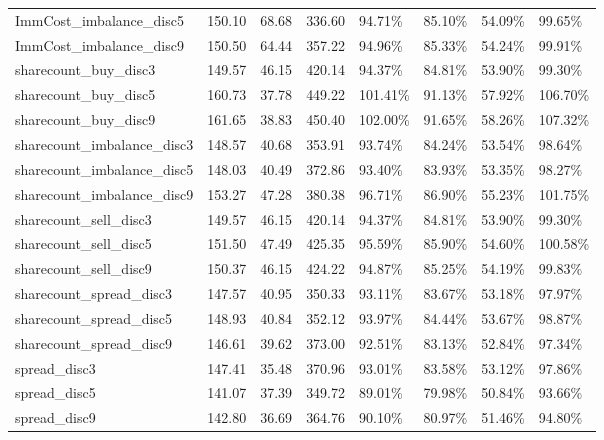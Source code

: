 \begin{table}[ht]
{\begin{tabular}{lrrrllll}
ImmCost\_imbalance\_disc5      &    150.10 &   68.68 &  336.60 &   94.71\% &   85.10\% &   54.09\% &       99.65\% \\
ImmCost\_imbalance\_disc9      &    150.50 &   64.44 &  357.22 &   94.96\% &   85.33\% &   54.24\% &       99.91\% \\
sharecount\_buy\_disc3         &    149.57 &   46.15 &  420.14 &   94.37\% &   84.81\% &   53.90\% &       99.30\% \\
sharecount\_buy\_disc5         &    160.73 &   37.78 &  449.22 &  101.41\% &   91.13\% &   57.92\% &      106.70\% \\
sharecount\_buy\_disc9         &    161.65 &   38.83 &  450.40 &  102.00\% &   91.65\% &   58.26\% &      107.32\% \\
sharecount\_imbalance\_disc3   &    148.57 &   40.68 &  353.91 &   93.74\% &   84.24\% &   53.54\% &       98.64\% \\
sharecount\_imbalance\_disc5   &    148.03 &   40.49 &  372.86 &   93.40\% &   83.93\% &   53.35\% &       98.27\% \\
sharecount\_imbalance\_disc9   &    153.27 &   47.28 &  380.38 &   96.71\% &   86.90\% &   55.23\% &      101.75\% \\
sharecount\_sell\_disc3        &    149.57 &   46.15 &  420.14 &   94.37\% &   84.81\% &   53.90\% &       99.30\% \\
sharecount\_sell\_disc5        &    151.50 &   47.49 &  425.35 &   95.59\% &   85.90\% &   54.60\% &      100.58\% \\
sharecount\_sell\_disc9        &    150.37 &   46.15 &  424.22 &   94.87\% &   85.25\% &   54.19\% &       99.83\% \\
sharecount\_spread\_disc3      &    147.57 &   40.95 &  350.33 &   93.11\% &   83.67\% &   53.18\% &       97.97\% \\
sharecount\_spread\_disc5      &    148.93 &   40.84 &  352.12 &   93.97\% &   84.44\% &   53.67\% &       98.87\% \\
sharecount\_spread\_disc9      &    146.61 &   39.62 &  373.00 &   92.51\% &   83.13\% &   52.84\% &       97.34\% \\
spread\_disc3                 &    147.41 &   35.48 &  370.96 &   93.01\% &   83.58\% &   53.12\% &       97.86\% \\
spread\_disc5                 &    141.07 &   37.39 &  349.72 &   89.01\% &   79.98\% &   50.84\% &       93.66\% \\
spread\_disc9                 &    142.80 &   36.69 &  364.76 &   90.10\% &   80.97\% &   51.46\% &       94.80\% \\

\end{tabular}}
\end{table}
